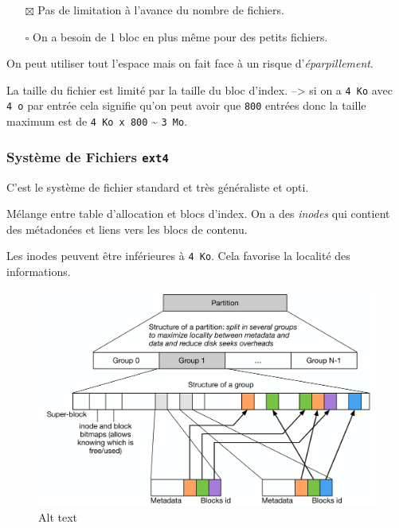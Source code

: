 \begin{itemize}
\tightlist
\item[$\boxtimes$]
  Pas de limitation à l'avance du nombre de fichiers.
\item[$\square$]
  On a besoin de 1 bloc en plus même pour des petits fichiers.
\end{itemize}

On peut utiliser tout l'espace mais on fait face à un risque
d'\emph{éparpillement}.

La taille du fichier est limité par la taille du bloc d'index.
--\textgreater{} si on a \texttt{4\ Ko} avec \texttt{4\ o} par entrée
cela signifie qu'on peut avoir que \texttt{800} entrées donc la taille
maximum est de \texttt{4\ Ko\ x\ 800} \textasciitilde{} \texttt{3\ Mo}.

\subsubsection{\texorpdfstring{Système de Fichiers
\texttt{ext4}}{Système de Fichiers ext4}}\label{systuxe8me-de-fichiers-ext4}

C'est le système de fichier standard et très généraliste et opti.

Mélange entre table d'allocation et blocs d'index. On a des
\emph{inodes} qui contient des métadonées et liens vers les blocs de
contenu.

Les inodes peuvent être inférieures à \texttt{4\ Ko}. Cela favorise la
localité des informations.

\begin{figure}
\centering
\includegraphics{image-44.png}
\caption{Alt text}
\end{figure}

